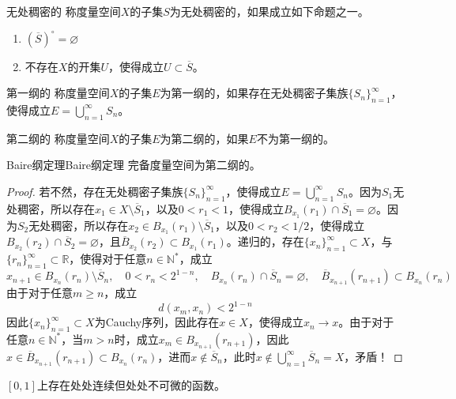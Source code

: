 \documentclass[lang = cn, scheme = chinese, thmcnt = section]{elegantbook}
\newcommand{\N}{\mathbb{N}}            %
\newcommand{\R}{\mathbb{R}}            %
\newcommand{\sub}{\subset}             %
\begin{document}
\begin{definition}{无处稠密的}
	称度量空间$X$的子集$S$为无处稠密的，如果成立如下命题之一。
	\begin{enumerate}
		\item $\left(\overline{S}\right)^\circ=\varnothing$
		\item 不存在$X$的开集$U$，使得成立$U\sub \overline{S}$。
	\end{enumerate}
\end{definition}

\begin{definition}{第一纲的}
	称度量空间$X$的子集$E$为第一纲的，如果存在无处稠密子集族$\{ S_n \}_{n=1}^{\infty}$，使得成立$\displaystyle E=\bigcup_{n=1}^{\infty}S_n$。
\end{definition}

\begin{definition}{第二纲的}
	称度量空间$X$的子集$E$为第二纲的，如果$E$不为第一纲的。
\end{definition}

\begin{theorem}{Baire纲定理}{Baire纲定理}
	完备度量空间为第二纲的。
\end{theorem}

\begin{proof}
	若不然，存在无处稠密子集族$\{ S_n \}_{n=1}^{\infty}$，使得成立$\displaystyle E=\bigcup_{n=1}^{\infty}S_n$。因为$S_1$无处稠密，所以存在$x_1\in X\setminus \overline{S}_1$，以及$0<r_1<1$，使得成立$B_{x_1}(r_1)\cap \overline{S}_1=\varnothing$。因为$S_2$无处稠密，所以存在$x_2\in B_{x_1}(r_1)\setminus \overline{S}_1$，以及$0<r_2<1/2$，使得成立$B_{x_2}(r_2)\cap \overline{S}_2=\varnothing$，且$\overline{B}_{x_2}(r_2)\sub B_{x_1}(r_1)$。递归的，存在$\{ x_n \}_{n=1}^{\infty}\sub X$，与$\{ r_n \}_{n=1}^{\infty}\sub \R$，使得对于任意$n\in\N^*$，成立
	$$
	x_{n+1}\in B_{x_n}(r_n)\setminus\overline{S}_n,\quad 
	0<r_n<2^{1-n},\quad
	B_{x_n}(r_n)\cap \overline{S}_n=\varnothing,\quad 
	\overline{B}_{x_{n+1}}(r_{n+1})\sub B_{x_n}(r_n)
	$$
	由于对于任意$m\ge n$，成立
	$$
	d(x_m,x_n)<2^{1-n}
	$$
	因此$\{ x_n \}_{n=1}^{\infty}\sub X$为Cauchy序列，因此存在$x\in X$，使得成立$x_n\to x$。由于对于任意$n\in\N^*$，当$m>n$时，成立$x_m\in B_{x_{n+1}}(r_{n+1})$，因此$x\in \overline{B}_{x_{n+1}}(r_{n+1})\sub B_{x_{n}}(r_{n})$，进而$x\notin \overline{S}_{n}$，此时$\displaystyle x\notin\bigcup_{n=1}^{\infty}\overline{S}_n=X$，矛盾！
\end{proof}

\begin{proposition}
	$[0,1]$上存在处处连续但处处不可微的函数。
\end{proposition}
\end{document}
